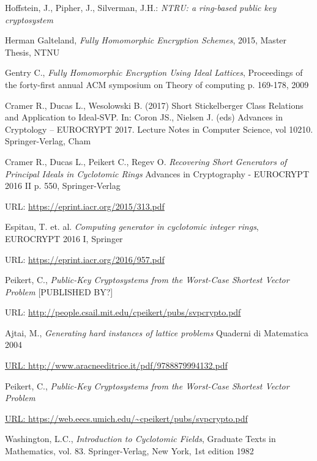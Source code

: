 \begin{thebibliography}{99}
 Hoffstein, J., Pipher, J., Silverman, J.H.: \emph{NTRU: a ring-based public key cryptosystem}

 Herman Galteland, \emph{Fully Homomorphic Encryption Schemes}, 2015, Master Thesis, NTNU

 Gentry C., \textit{Fully Homomorphic Encryption Using Ideal Lattices}, Proceedings of the forty-first annual ACM symposium on Theory of computing p. 169-178, 2009

 Cramer R., Ducas L., Wesolowski B. (2017) Short Stickelberger Class Relations and Application to Ideal-SVP. In: Coron JS., Nielsen J. (eds) Advances in Cryptology – EUROCRYPT 2017. Lecture Notes in Computer Science, vol 10210. Springer-Verlag, Cham 

 Cramer R., Ducas L., Peikert C., Regev O. \emph{Recovering Short Generators of Principal Ideals in Cyclotomic Rings} Advances in Cryptography - EUROCRYPT 2016 II p. 550, Springer-Verlag

URL: \url{https://eprint.iacr.org/2015/313.pdf}

Espitau, T. et. al. \emph{Computing generator in cyclotomic integer rings}, EUROCRYPT 2016 I, Springer

URL: \url{https://eprint.iacr.org/2016/957.pdf}

 Peikert, C., \emph{Public-Key Cryptosystems from the
Worst-Case Shortest Vector Problem} [PUBLISHED BY?]

URL: \url{http://people.csail.mit.edu/cpeikert/pubs/svpcrypto.pdf}

  Ajtai, M., \emph{Generating hard instances of lattice problems} Quaderni di Matematica 2004

\url{URL: http://www.aracneeditrice.it/pdf/9788879994132.pdf}

 Peikert, C., \emph{Public-Key Cryptosystems from the Worst-Case Shortest Vector Problem}

\url{URL: https://web.eecs.umich.edu/~cpeikert/pubs/svpcrypto.pdf}

 Washington, L.C., \emph{Introduction to Cyclotomic Fields}, Graduate Texts in Mathematics,
vol. 83. Springer-Verlag, New York, 1st edition 1982


\end{thebibliography}
